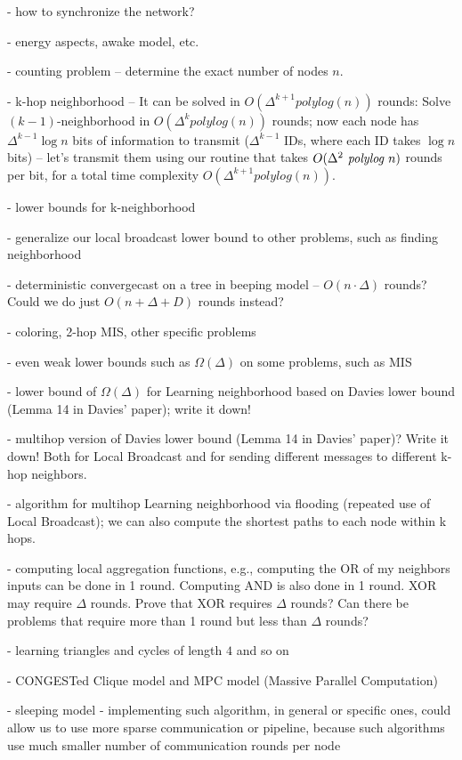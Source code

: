 {{- how to synchronize the network?

- energy aspects, awake model, etc.

}

- counting problem -- determine the exact number of nodes $n$.

- k-hop neighborhood -- It can be solved in $O(\Delta^{k+1} polylog(n))$ rounds: Solve $(k-1)$-neighborhood in $O(\Delta^{k} polylog(n))$ rounds; now each node has $\Delta^{k-1} \log n$ bits of information to transmit ($\Delta^{k-1}$ IDs, where each ID takes $\log n$ bits) -- let's transmit them using our routine that takes $O(\Delta^2 \text{\em\ polylog } n)$ rounds per bit, for a total time complexity $O(\Delta^{k+1} polylog(n))$.

- lower bounds for k-neighborhood

- generalize our local broadcast lower bound to other problems, such as finding neighborhood

- deterministic convergecast on a tree in beeping model -- $O(n\cdot \Delta)$ rounds? Could we do just $O(n+\Delta+D)$ rounds instead?

- coloring, 2-hop MIS, other specific problems

- even weak lower bounds such as $\Omega(\Delta)$ on some problems, such as MIS

- lower bound of $\Omega(\Delta)$ for Learning neighborhood based on Davies lower bound (Lemma 14 in Davies' paper); write it down!

- multihop version of Davies lower bound (Lemma 14 in Davies' paper)? Write it down! Both for Local Broadcast and for sending different messages to different k-hop neighbors.

- algorithm for multihop Learning neighborhood via flooding (repeated use of Local Broadcast); we can also compute the shortest paths to each node within k hops.

- computing local aggregation functions, e.g., computing the OR of my neighbors inputs can be done in 1 round. Computing AND is also done in 1 round. XOR may require $\Delta$ rounds. Prove that XOR requires $\Delta$ rounds? Can there be problems that require more than 1 round but less than $\Delta$ rounds?

- learning triangles and cycles of length $4$ and so on

- CONGESTed Clique model and MPC model (Massive Parallel Computation)

- sleeping model - implementing such algorithm, in general or specific ones, could allow us to use more sparse communication or pipeline, because such algorithms use much smaller number of communication rounds per node



}%


